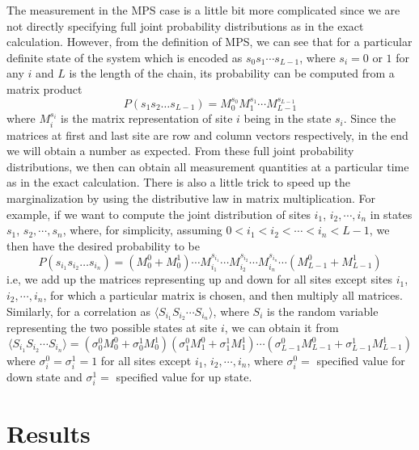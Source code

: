 \documentclass[english]{article}[12pt]
\begin{document}
The measurement in the MPS case is a little bit more complicated since we are not directly specifying full joint probability distributions as in the exact calculation. However, from the definition of MPS, we can see that for a particular definite state of the system which is encoded as $s_0s_1\cdots s_{L-1}$, where $s_i=0$ or $1$ for any $i$ and $L$ is the length of the chain, its probability can be computed from a matrix product 
\begin{displaymath}
P(s_1s_2\dots s_{L-1}) = M_0^{s_0}M_1^{s_1}\cdots M_{L-1}^{s_{L-1}}
\end{displaymath} 
where $M_i^{s_i}$ is the matrix representation of site $i$ being in the state $s_i$. Since the matrices at first and last site are row and column vectors respectively, in the end we will obtain a number as expected. From these full joint probability distributions, we then can obtain all measurement quantities at a particular time as in the exact calculation. There is also a little trick to speed up the marginalization by using the distributive law in matrix multiplication. For example, if we want to compute the joint distribution of sites $i_1$, $i_2,\cdots,i_n$ in states $s_1$, $s_2,\cdots,s_n$, where, for simplicity, assuming $0<i_1<i_2<\cdots<i_n<L-1$, we then have the desired probability to be
\begin{displaymath}
P(s_{i_1}s_{i_2}\dots s_{i_n}) = (M_0^{0} + M_0^{1})\cdots M_{i_1}^{s_{i_1}}\cdots M_{i_2}^{s_{i_2}} \cdots M_{i_n}^{s_{i_n}} \cdots (M_{L-1}^{0} + M_{L-1}^{1})
\end{displaymath}
i.e, we add up the matrices representing up and down for all sites except sites $i_1$, $i_2,\cdots,i_n$, for which a particular matrix is chosen, and then multiply all matrices. Similarly, for a correlation as $\langle S_{i_1} S_{i_2} \cdots S_{i_n} \rangle$, where $S_i$ is the random variable representing the two possible states at site $i$, we can obtain it from
\begin{displaymath}
\langle S_{i_1} S_{i_2} \cdots S_{i_n} \rangle = (\sigma_0^0 M_0^0 + \sigma_0^1M_0^1)(\sigma_1^0M_1^0 + \sigma_1^1M_1^1)\cdots (\sigma_{L-1}^0M_{L-1}^0 + \sigma_{L-1}^1M^1_{L-1})
\end{displaymath}
where $\sigma_i^0=\sigma_i^1=1$ for all sites except $i_1$, $i_2,\cdots,i_n$, where $\sigma_i^0=$ specified value for down state and $\sigma_i^1=$ specified value for up state. 
\vspace{3mm}

\section{Results}
\end{document}
